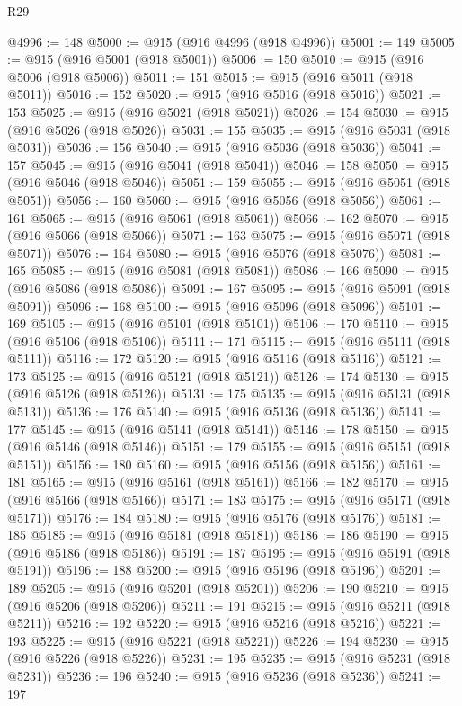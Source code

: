 \begin{lexlean}{R29}
\begin{coremodule}
@4996 := 148
@5000 := @915 (@916 @4996 (@918 @4996))
@5001 := 149
@5005 := @915 (@916 @5001 (@918 @5001))
@5006 := 150
@5010 := @915 (@916 @5006 (@918 @5006))
@5011 := 151
@5015 := @915 (@916 @5011 (@918 @5011))
@5016 := 152
@5020 := @915 (@916 @5016 (@918 @5016))
@5021 := 153
@5025 := @915 (@916 @5021 (@918 @5021))
@5026 := 154
@5030 := @915 (@916 @5026 (@918 @5026))
@5031 := 155
@5035 := @915 (@916 @5031 (@918 @5031))
@5036 := 156
@5040 := @915 (@916 @5036 (@918 @5036))
@5041 := 157
@5045 := @915 (@916 @5041 (@918 @5041))
@5046 := 158
@5050 := @915 (@916 @5046 (@918 @5046))
@5051 := 159
@5055 := @915 (@916 @5051 (@918 @5051))
@5056 := 160
@5060 := @915 (@916 @5056 (@918 @5056))
@5061 := 161
@5065 := @915 (@916 @5061 (@918 @5061))
@5066 := 162
@5070 := @915 (@916 @5066 (@918 @5066))
@5071 := 163
@5075 := @915 (@916 @5071 (@918 @5071))
@5076 := 164
@5080 := @915 (@916 @5076 (@918 @5076))
@5081 := 165
@5085 := @915 (@916 @5081 (@918 @5081))
@5086 := 166
@5090 := @915 (@916 @5086 (@918 @5086))
@5091 := 167
@5095 := @915 (@916 @5091 (@918 @5091))
@5096 := 168
@5100 := @915 (@916 @5096 (@918 @5096))
@5101 := 169
@5105 := @915 (@916 @5101 (@918 @5101))
@5106 := 170
@5110 := @915 (@916 @5106 (@918 @5106))
@5111 := 171
@5115 := @915 (@916 @5111 (@918 @5111))
@5116 := 172
@5120 := @915 (@916 @5116 (@918 @5116))
@5121 := 173
@5125 := @915 (@916 @5121 (@918 @5121))
@5126 := 174
@5130 := @915 (@916 @5126 (@918 @5126))
@5131 := 175
@5135 := @915 (@916 @5131 (@918 @5131))
@5136 := 176
@5140 := @915 (@916 @5136 (@918 @5136))
@5141 := 177
@5145 := @915 (@916 @5141 (@918 @5141))
@5146 := 178
@5150 := @915 (@916 @5146 (@918 @5146))
@5151 := 179
@5155 := @915 (@916 @5151 (@918 @5151))
@5156 := 180
@5160 := @915 (@916 @5156 (@918 @5156))
@5161 := 181
@5165 := @915 (@916 @5161 (@918 @5161))
@5166 := 182
@5170 := @915 (@916 @5166 (@918 @5166))
@5171 := 183
@5175 := @915 (@916 @5171 (@918 @5171))
@5176 := 184
@5180 := @915 (@916 @5176 (@918 @5176))
@5181 := 185
@5185 := @915 (@916 @5181 (@918 @5181))
@5186 := 186
@5190 := @915 (@916 @5186 (@918 @5186))
@5191 := 187
@5195 := @915 (@916 @5191 (@918 @5191))
@5196 := 188
@5200 := @915 (@916 @5196 (@918 @5196))
@5201 := 189
@5205 := @915 (@916 @5201 (@918 @5201))
@5206 := 190
@5210 := @915 (@916 @5206 (@918 @5206))
@5211 := 191
@5215 := @915 (@916 @5211 (@918 @5211))
@5216 := 192
@5220 := @915 (@916 @5216 (@918 @5216))
@5221 := 193
@5225 := @915 (@916 @5221 (@918 @5221))
@5226 := 194
@5230 := @915 (@916 @5226 (@918 @5226))
@5231 := 195
@5235 := @915 (@916 @5231 (@918 @5231))
@5236 := 196
@5240 := @915 (@916 @5236 (@918 @5236))
@5241 := 197

\end{coremodule}
\end{lexlean}
